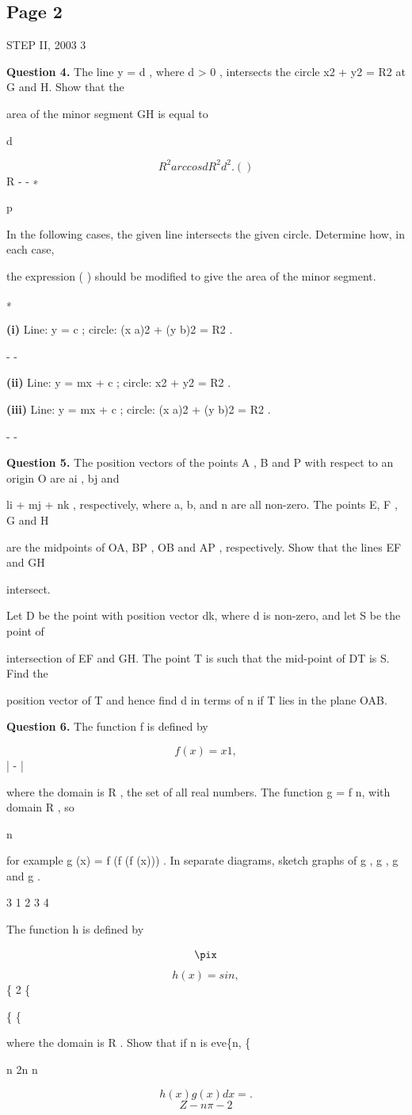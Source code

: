 \documentclass[12pt]{article}
\begin{document}
\subsection*{Page 2}
\begin{flushleft}
STEP II, 2003 3\par
\bigskip\textbf{Question 4.} The line y = d , where d > 0 , intersects the circle x2 + y2 = R2 at G and H. Show that the\par
area of the minor segment GH is equal to\par
d\par
\[R^2 arccos d R^2 d^2 . ( )\]
\lambda R \mu - - ∗\par
p\par
In the following cases, the given line intersects the given circle. Determine how, in each case,\par
the expression ( ) should be modified to give the area of the minor segment.\par
∗\par
\textbf{(i)} Line: y = c ; circle: (x a)2 + (y b)2 = R2 .\par
- -\par
\textbf{(ii)} Line: y = mx + c ; circle: x2 + y2 = R2 .\par
\textbf{(iii)} Line: y = mx + c ; circle: (x a)2 + (y b)2 = R2 .\par
- -\par
\bigskip\textbf{Question 5.} The position vectors of the points A , B and P with respect to an origin O are ai , bj and\par
li + mj + nk , respectively, where a, b, and n are all non-zero. The points E, F , G and H\par
are the midpoints of OA, BP , OB and AP , respectively. Show that the lines EF and GH\par
intersect.\par
Let D be the point with position vector dk, where d is non-zero, and let S be the point of\par
intersection of EF and GH. The point T is such that the mid-point of DT is S. Find the\par
position vector of T and hence find d in terms of n if T lies in the plane OAB.\par
\bigskip\textbf{Question 6.} The function f is defined by\par
\[f (x) = x 1 ,\]
| - |\par
where the domain is R , the set of all real numbers. The function g = f n, with domain R , so\par
n\par
for example g (x) = f (f (f (x))) . In separate diagrams, sketch graphs of g , g , g and g .\par
3 1 2 3 4\par
The function h is defined by\par
\[\pix\]
\[h (x) = sin ,\]
\{ 2 \{\par
\{ \{\par
where the domain is R . Show that if n is eve\{n, \{\par
n 2n n\par
\[h (x) g (x) dx = .\]
\[Z - n \pi - 2\]
\end{flushleft}
\end{document}
